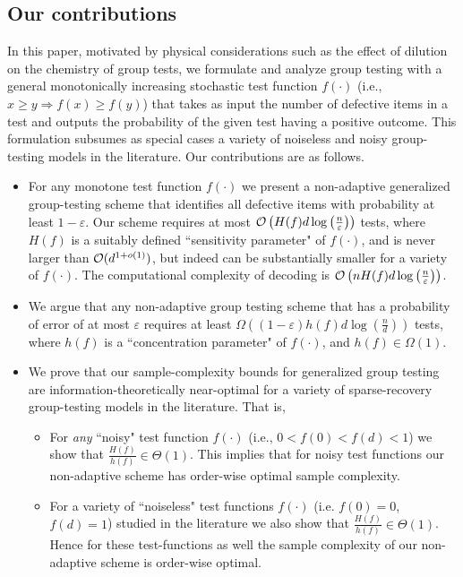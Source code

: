 \documentclass[onecolumn,letterpaper]{IEEEtran}
\newcommand{\cO}{{\cal O}}
\newcommand{\fh}{{h(f)}}
\newcommand{\fH}{{H(f)}}
\begin{document}
\subsection{Our contributions}
In this paper, motivated by physical considerations such as the effect of dilution on the chemistry of group tests, we formulate and analyze group testing with a general monotonically increasing stochastic test function $f(\cdot)$ (i.e., $x \geq y \Rightarrow f(x) \geq f(y)$) that takes as input the number of defective items in a test and outputs the probability of the given test having a positive outcome. This formulation subsumes as special cases a variety of noiseless and noisy group-testing models in the literature. Our contributions are as follows. 
\begin{itemize}
\item For any monotone test function $f(\cdot)$ we present a non-adaptive generalized group-testing scheme that identifies all defective items with probability at least $1-\varepsilon$. Our scheme requires at most ${\cal O}\left( \fH d\log\left(\frac {n} {\varepsilon}\right)\right)$ tests, where $\fH$ is a suitably defined ``sensitivity parameter" of $f(\cdot)$, and is never larger than ${\cal O}(d^{1+o(1)})$, but indeed can be substantially smaller for a variety of $f(\cdot)$.  The computational complexity of decoding is $\cO \left( n\fH d  \log \left(\frac {n} {\varepsilon}\right) \right)$.

\item We argue that any non-adaptive group testing scheme that has a probability of error of at most $\varepsilon$ requires at least $\Omega \left((1-\varepsilon)\fh d\log\left(\frac n d\right)\right)$ tests, where $\fh$ is a ``concentration parameter" of $f(\cdot)$, and $\fh \in \Omega{(1)}$. 

\item We prove that our sample-complexity bounds for generalized group testing are information-theoretically near-optimal for a variety of sparse-recovery group-testing models in the literature. That is, 
\begin{itemize}
    \item For {\it any} ``noisy" test function $f(\cdot)$
(i.e., $0< f(0) < f(d) <1$) we show that
$\frac{\fH}{\fh} \in \Theta(1)$. This implies that for noisy test functions our non-adaptive scheme has order-wise optimal sample complexity.%

\item For a variety of ``noiseless" test functions $f(\cdot)$ (i.e. $f(0)=0$, $f(d)=1$) studied in the literature we also show that $\frac{\fH}{\fh} \in \Theta(1)$. Hence for these test-functions as well the sample complexity of our non-adaptive scheme is order-wise optimal. %


\end{itemize}
\end{itemize}
\end{document}
